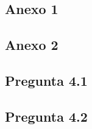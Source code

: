\subsection{Anexo 1}
\label{sec:anexo1}
\begin{small}
	
\end{small}

\subsection{Anexo 2}
\label{sec:anexo2}
\begin{small}
	
\end{small}

\subsection{Pregunta 4.1}
\label{sec:anexo2}
\begin{small}
	
\end{small}

\subsection{Pregunta 4.2}
\label{sec:anexo2}
\begin{small}
	
\end{small}
